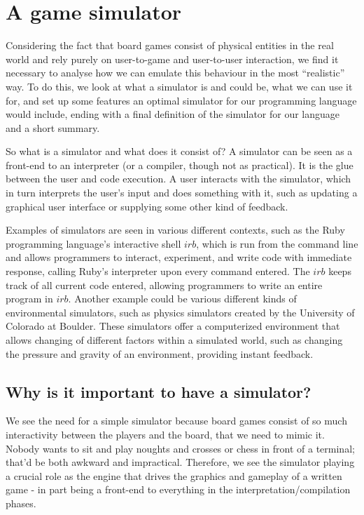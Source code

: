 \section{A game simulator}
\label{sec:simulator}
Considering the fact that board games consist of physical entities in the real
world and rely purely on user-to-game and user-to-user interaction, we find it
necessary to analyse how we can emulate this behaviour in the most ``realistic''
way. To do this, we look at what a simulator is and could be, what we can use it
for, and set up some features an optimal simulator for our programming language
would include, ending with a final definition of the simulator for our language
and a short summary.

So what is a simulator and what does it consist of? A simulator can be seen as a
front-end to an interpreter (or a compiler, though not as practical). It is the
glue between the user and code execution. A user interacts with the simulator,
which in turn interprets the user's input and does something with it, such as
updating a graphical user interface or supplying some other kind of feedback.

Examples of simulators are seen in various different contexts, such as the
Ruby programming language's interactive shell $irb$, \cite{rubyLang} which is run
from the command line and allows programmers to interact, experiment, and write
code with immediate response, calling Ruby's interpreter upon every command
entered. The $irb$ keeps track of all current code entered, allowing programmers
to write an entire program in $irb$. Another example could be various different
kinds of environmental simulators, such as physics simulators created by the
University of Colorado at Boulder. \cite{colSim} These simulators offer a
computerized environment that allows changing of different factors within a
simulated world, such as changing the pressure and gravity of an environment,
providing instant feedback.

\subsection{Why is it important to have a simulator?}
We see the need for a simple simulator because board games consist of so much
interactivity between the players and the board, that we need to mimic it.
Nobody wants to sit and play noughts and crosses or chess in front of a
terminal; that'd be both awkward and impractical. Therefore, we see the
simulator playing a crucial role as the engine that drives the graphics and
gameplay of a written game - in part being a front-end to everything in the
interpretation/compilation phases.

